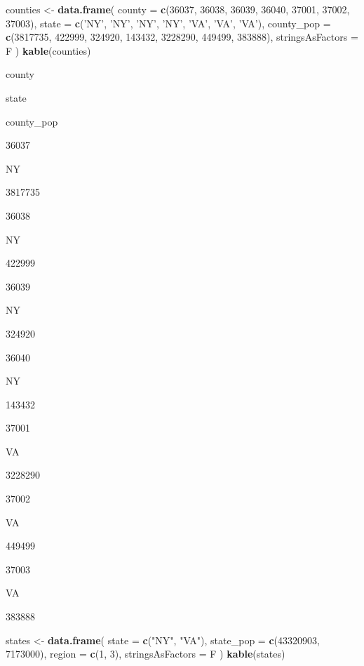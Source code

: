 \documentclass[]{book}
\newenvironment{Shaded}{\begin{snugshade}}{\end{snugshade}}
\newcommand{\KeywordTok}[1]{\textcolor[rgb]{0.13,0.29,0.53}{\textbf{#1}}}
\newcommand{\DataTypeTok}[1]{\textcolor[rgb]{0.13,0.29,0.53}{#1}}
\newcommand{\DecValTok}[1]{\textcolor[rgb]{0.00,0.00,0.81}{#1}}
\newcommand{\StringTok}[1]{\textcolor[rgb]{0.31,0.60,0.02}{#1}}
\newcommand{\NormalTok}[1]{#1}
\begin{document}
\begin{Shaded}
\begin{Highlighting}[]
\NormalTok{counties <-}\StringTok{ }\KeywordTok{data.frame}\NormalTok{(}
  \DataTypeTok{county =} \KeywordTok{c}\NormalTok{(}\DecValTok{36037}\NormalTok{, }\DecValTok{36038}\NormalTok{, }\DecValTok{36039}\NormalTok{, }\DecValTok{36040}\NormalTok{, }\DecValTok{37001}\NormalTok{, }\DecValTok{37002}\NormalTok{, }\DecValTok{37003}\NormalTok{),}
  \DataTypeTok{state =} \KeywordTok{c}\NormalTok{(}\StringTok{'NY'}\NormalTok{, }\StringTok{'NY'}\NormalTok{, }\StringTok{'NY'}\NormalTok{, }\StringTok{'NY'}\NormalTok{, }\StringTok{'VA'}\NormalTok{, }\StringTok{'VA'}\NormalTok{, }\StringTok{'VA'}\NormalTok{),}
  \DataTypeTok{county_pop =} \KeywordTok{c}\NormalTok{(}\DecValTok{3817735}\NormalTok{, }\DecValTok{422999}\NormalTok{, }\DecValTok{324920}\NormalTok{, }\DecValTok{143432}\NormalTok{, }\DecValTok{3228290}\NormalTok{, }\DecValTok{449499}\NormalTok{, }\DecValTok{383888}\NormalTok{), }\DataTypeTok{stringsAsFactors =}\NormalTok{ F}
\NormalTok{)}
\KeywordTok{kable}\NormalTok{(counties)}
\end{Highlighting}
\end{Shaded}

county

state

county\_pop

36037

NY

3817735

36038

NY

422999

36039

NY

324920

36040

NY

143432

37001

VA

3228290

37002

VA

449499

37003

VA

383888

\begin{Shaded}
\begin{Highlighting}[]

\NormalTok{states <-}\StringTok{ }\KeywordTok{data.frame}\NormalTok{(}
  \DataTypeTok{state =} \KeywordTok{c}\NormalTok{(}\StringTok{"NY"}\NormalTok{, }\StringTok{"VA"}\NormalTok{),}
  \DataTypeTok{state_pop =} \KeywordTok{c}\NormalTok{(}\DecValTok{43320903}\NormalTok{, }\DecValTok{7173000}\NormalTok{),}
  \DataTypeTok{region =} \KeywordTok{c}\NormalTok{(}\DecValTok{1}\NormalTok{, }\DecValTok{3}\NormalTok{), }\DataTypeTok{stringsAsFactors =}\NormalTok{ F}
\NormalTok{)}
\KeywordTok{kable}\NormalTok{(states)}
\end{Highlighting}
\end{Shaded}
\end{document}
